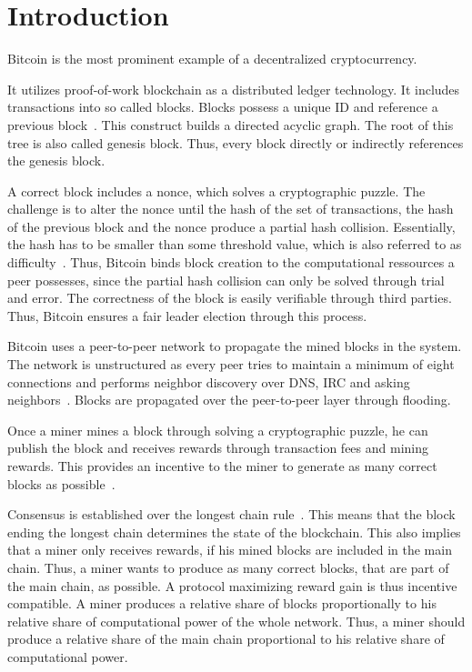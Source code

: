 \chapter{Introduction}\label{chap:introduction}
Bitcoin is the most prominent example of a decentralized cryptocurrency. 


It utilizes proof-of-work blockchain as a distributed ledger technology.
It includes transactions into so called blocks. Blocks possess a unique ID and reference a previous block~\cite{tschorsch}. This construct builds a directed acyclic graph. The root of this tree is also called genesis block. Thus, every block directly or indirectly references the genesis block.


A correct block includes a nonce, which solves a cryptographic puzzle. The challenge is to alter the nonce until the hash of the set of transactions, the hash of the previous block and the nonce produce a partial hash collision. Essentially, the hash has to be smaller than some threshold value, which is also referred to as difficulty~\cite{tschorsch}.
Thus, Bitcoin binds block creation to the computational ressources a peer possesses, since the partial hash collision can only be solved through trial and error. The correctness of the block is easily verifiable through third parties. Thus, Bitcoin ensures a fair leader election through this process.

Bitcoin uses a peer-to-peer network to propagate the mined blocks in the system. The network is unstructured as every peer tries to maintain a minimum of eight connections and performs neighbor discovery over DNS, IRC and asking neighbors~\cite{tschorsch}. Blocks are propagated over the peer-to-peer layer through flooding.

Once a miner mines a block through solving a cryptographic puzzle, he can publish the block and receives rewards through transaction fees and mining rewards. This provides an incentive to the miner to generate as many correct blocks as possible~\cite{1}.

Consensus is established over the longest chain rule~\cite{1}. This means that the block ending the longest chain determines the state of the blockchain. This also implies that a miner only receives rewards, if his mined blocks are included in the main chain. Thus, a miner wants to produce as many correct blocks, that are part of the main chain, as possible. A protocol maximizing reward gain is thus incentive compatible.
A miner produces a relative share of blocks proportionally to his relative share of computational power of the whole network. Thus, a miner should produce a relative share of the main chain proportional to his relative share of computational power.

